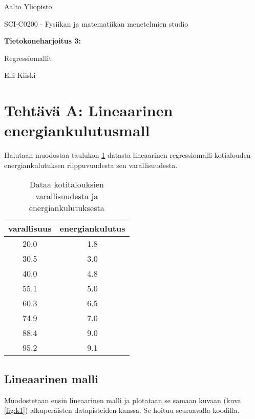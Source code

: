 \documentclass[a4paper,11pt]{article}
\begin{document}
{
\thispagestyle{empty}

{\large
Aalto Yliopisto
\par
SCI-C0200 - Fysiikan ja matematiikan menetelmien studio
}

\vspace{7cm}

{\huge \bf
Tietokoneharjoitus 3: 
\par
Regressiomallit}

\vspace{2cm}

{\Large Elli Kiiski}

\clearpage

\tableofcontents

\clearpage

\section{Tehtävä A: Lineaarinen energiankulutusmall}

Halutaan muodostaa taulukon \ref{table:t} datasta lineaarinen regressiomalli kotialouden energiankulutuksen riippuvuudesta sen varallisuudesta.

\begin{table}[!htb]
    \centering
    \begin{tabular}{|c|c|}
    \hline
    varallisuus & energiankulutus \\
    \hline
    20.0 & 1.8 \\
    30.5 & 3.0 \\
    40.0 & 4.8 \\
    55.1 & 5.0 \\
    60.3 & 6.5 \\
    74.9 & 7.0 \\
    88.4 & 9.0 \\
    95.2 & 9.1 \\
    \hline
    \end{tabular}
    \caption{Dataa kotitalouksien varallisuudesta ja energiankulutuksesta}
    \label{table:t}
\end{table}

\subsection{Lineaarinen malli}

Muodostetaan ensin lineaarinen malli ja plotataan se samaan kuvaan (kuva \ref{fig:k1}) alkuperäisten datapisteiden kanssa. Se hoituu seuraavalla koodilla.

}
\end{document}
